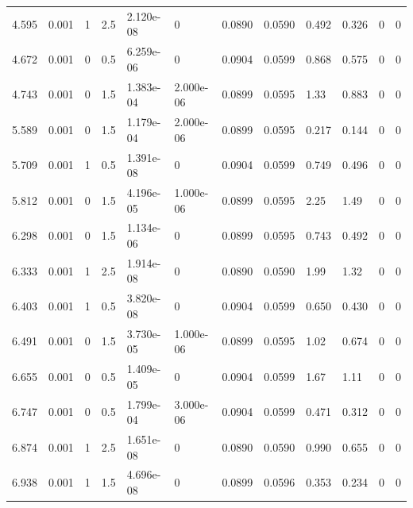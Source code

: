 \documentclass[preview]{standalone}
\begin{document}
{{\begin{tabular}{L{1.2cm}C{1.2cm} C{0.3cm}C{0.5cm} C{1.4cm}C{1.4cm} C{1.4cm}C{1.4cm} C{1.6cm}C{1.6cm} C{1.6cm}C{1.6cm}}
  4.595  &  0.001  & 1     & 2.5 &  2.120e-08  & 0  &  0.0890&   0.0590& 0.492 & 0.326   &  0 & 0  \\ 
  4.672  &  0.001  & 0     & 0.5 &  6.259e-06  & 0  &  0.0904&   0.0599& 0.868 & 0.575   &  0 & 0  \\ 
  4.743  &  0.001  & 0     & 1.5 &  1.383e-04  & 2.000e-06  &  0.0899&   0.0595& 1.33 & 0.883   &  0 & 0  \\ 
  5.589  &  0.001  & 0     & 1.5 &  1.179e-04  & 2.000e-06  &  0.0899&   0.0595& 0.217 & 0.144   &  0 & 0  \\ 
  5.709  &  0.001  & 1     & 0.5 &  1.391e-08  & 0  &  0.0904&   0.0599& 0.749 & 0.496   &  0 & 0  \\ 
  5.812  &  0.001  & 0     & 1.5 &  4.196e-05  & 1.000e-06  &  0.0899&   0.0595& 2.25 & 1.49   &  0 & 0  \\ 
  6.298  &  0.001  & 0     & 1.5 &  1.134e-06  & 0  &  0.0899&   0.0595& 0.743 & 0.492   &  0 & 0  \\ 
  6.333  &  0.001  & 1     & 2.5 &  1.914e-08  & 0  &  0.0890&   0.0590& 1.99 & 1.32   &  0 & 0  \\ 
  6.403  &  0.001  & 1     & 0.5 &  3.820e-08  & 0  &  0.0904&   0.0599& 0.650 & 0.430   &  0 & 0  \\ 
  6.491  &  0.001  & 0     & 1.5 &  3.730e-05  & 1.000e-06  &  0.0899&   0.0595& 1.02 & 0.674   &  0 & 0  \\ 
  6.655  &  0.001  & 0     & 0.5 &  1.409e-05  & 0  &  0.0904&   0.0599& 1.67 & 1.11   &  0 & 0  \\ 
  6.747  &  0.001  & 0     & 0.5 &  1.799e-04  & 3.000e-06  &  0.0904&   0.0599& 0.471 & 0.312   &  0 & 0  \\ 
  6.874  &  0.001  & 1     & 2.5 &  1.651e-08  & 0  &  0.0890&   0.0590& 0.990 & 0.655   &  0 & 0  \\ 
  6.938  &  0.001  & 1     & 1.5 &  4.696e-08  & 0  &  0.0899&   0.0596& 0.353 & 0.234   &  0 & 0  \\ 
\hline 
\end{tabular} 

}}
\end{document}
